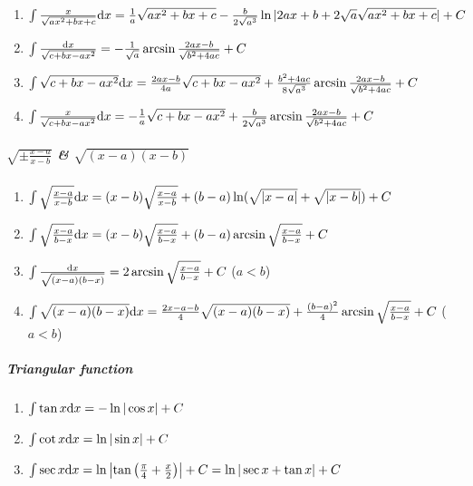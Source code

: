 \begin{tiny}
\begin{enumerate}
\item $ \int \frac{x}{\sqrt{ax^2+bx+c}} \mathrm{d} x = \frac{1}{a}\sqrt{ax^2+bx+c} -
	\frac{b}{2\sqrt{a^3}}\ln | 2ax+b+2\sqrt{a}\sqrt{ax^2+bx+c} | + C $

\item $ \int \frac{\mathrm{d} x}{\sqrt{c+bx-ax^2}} = -\frac{1}{\sqrt{a}} \arcsin \frac{2ax-b}{\sqrt{b^2+4ac}} + C  $

\item $ \int \sqrt{c+bx-ax^2} \mathrm{d} x = \frac{2ax-b}{4a}\sqrt{c+bx-ax^2} + \\
	\frac{b^2+4ac}{8\sqrt{a^3}}\arcsin\frac{2ax-b}{\sqrt{b^2+4ac}} + C $

\item $ \int \frac{x}{\sqrt{c+bx-ax^2}} \mathrm{d} x = -\frac{1}{a}\sqrt{c+bx-ax^2} + \frac{b}{2\sqrt{a^3}}\arcsin\frac{2ax-b}{\sqrt{b^2+4ac}} + C $

\end{enumerate}

\subparagraph{$\sqrt{\pm\frac{x-a}{x-b}}$ \& $\sqrt{(x-a)(x-b)}$}

\begin{enumerate}

\item $ \int \sqrt\frac{x-a}{x-b} \mathrm{d} x = (x-b)\sqrt\frac{x-a}{x-b} + (b-a)\ln(\sqrt{|x-a|}+\sqrt{|x-b|}) + C $

\item $ \int \sqrt\frac{x-a}{b-x} \mathrm{d} x = (x-b)\sqrt\frac{x-a}{b-x} + (b-a)\arcsin\sqrt\frac{x-a}{b-x} + C $

\item $ \int \frac{\mathrm{d} x}{\sqrt{(x-a)(b-x)}} = 2\arcsin\sqrt\frac{x-a}{b-x} + C$ ($a<b$)

\item $ \int \sqrt{(x-a)(b-x)} \mathrm{d} x = \frac{2x-a-b}{4}\sqrt{(x-a)(b-x)} + \frac{(b-a)^2}{4}\arcsin\sqrt\frac{x-a}{b-x} + C $ ($a<b$)

\end{enumerate}

\subparagraph{Triangular function}

\begin{enumerate}

\item $ \int \tan x \mathrm{d} x = -\ln|\cos x| + C $

\item $ \int \cot x \mathrm{d} x = \ln |\sin x| + C $

\item $ \int \sec x \mathrm{d} x = \ln \left| \tan\left( \frac{\pi}{4} + \frac{x}{2} \right) \right| + C = \ln |\sec x + \tan x| + C $


\end{enumerate}
\end{tiny}
